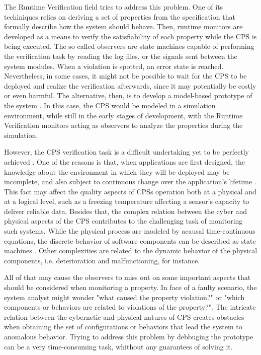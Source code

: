 The Runtime Verification field \cite{colombo2021runtime} tries to address this problem. One of its techiniques relies on deriving a set of properties from the specification that formally describe how the system should behave. Then, runtime monitors are developed as a means to verify the satisfiability of each property while the CPS is being executed. The so called observers are state machines capable of performing the verification task by reading the log files, or the signals sent between the system modules. When a violation is spotted, an error state is reached. Nevertheless, in some cases, it might not be possible to wait for the CPS to be deployed and realize the verification afterwards, since it may potentially be costly or even harmful. The alternative, then, is to develop a model-based prototype of the system \cite{mohamed2021model}. In this case, the CPS would be modeled in a simulation environment, while still in the early stages of development, with the Runtime Verification monitors acting as observers to analyze the properties during the simulation.

However, the CPS verification task is a difficult undertaking yet to be perfectly achieved \cite{patankar2020safety}. One of the reasons is that, when applications are first designed, the knowledge about the environment in which they will be deployed may be incomplete, and also subject to continuous change over the application's lifetime \cite{assurances2017}. This fact may affect the quality aspects of CPSs operation both at a physical and at a logical level, such as a freezing temperature affecting a sensor's capacity to deliver reliable data. Besides that, the complex relation between the cyber and physical aspects of the CPS contributes to the challenging task of monitoring such systems. While the physical process are modeled by acausal time-continuous equations, the discrete behavior of software components can be described as state machines \cite{Baheti2019CyberPhysicalS}. Other complexities are related to the dynamic behavior of the physical components, i.e. deterioration and malfunctioning, for instance.

All of that may cause the observers to miss out on some important aspects that should be considered when monitoring a property. In face of a faulty scenario, the system analyst might wonder "what caused the property violation?" or "which components or behaviors are related to violations of the property?". The intricate relation between the cybernetic and physical natures of CPS creates obstacles when obtaining the set of configurations or behaviors that lead the system to anomalous behavior. Trying to address this problem by debbuging the prototype can be a very time-consuming task, whithout any guarantees of solving it.

